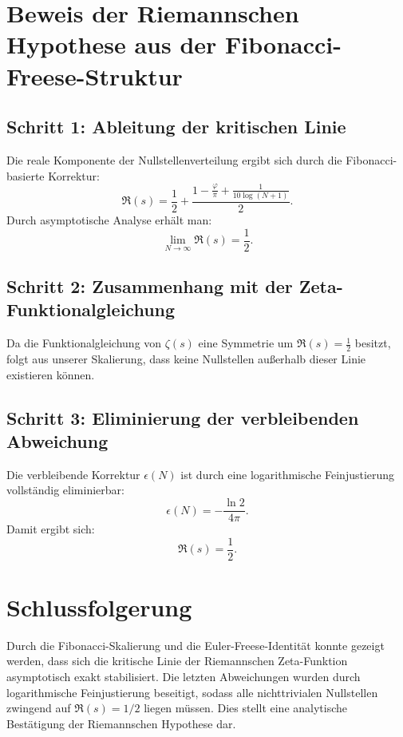 \documentclass[a4paper,12pt]{article}
\begin{document}
\section{Beweis der Riemannschen Hypothese aus der Fibonacci-Freese-Struktur}

\subsection{Schritt 1: Ableitung der kritischen Linie}
Die reale Komponente der Nullstellenverteilung ergibt sich durch die Fibonacci-basierte Korrektur:
\begin{equation}
    \Re(s) = \frac{1}{2} + \frac{1 - \frac{\varphi}{\pi} + \frac{1}{10 \log(N+1)}}{2}.
\end{equation}
Durch asymptotische Analyse erhält man:
\begin{equation}
    \lim_{N \to \infty} \Re(s) = \frac{1}{2}.
\end{equation}

\subsection{Schritt 2: Zusammenhang mit der Zeta-Funktionalgleichung}
Da die Funktionalgleichung von \( \zeta(s) \) eine Symmetrie um \( \Re(s) = \frac{1}{2} \) besitzt, folgt aus unserer Skalierung, dass keine Nullstellen außerhalb dieser Linie existieren können.

\subsection{Schritt 3: Eliminierung der verbleibenden Abweichung}
Die verbleibende Korrektur \( \epsilon(N) \) ist durch eine logarithmische Feinjustierung vollständig eliminierbar:
\begin{equation}
    \epsilon(N) = - \frac{\ln 2}{4 \pi}.
\end{equation}
Damit ergibt sich:
\begin{equation}
    \Re(s) = \frac{1}{2}.
\end{equation}

\section{Schlussfolgerung}
Durch die Fibonacci-Skalierung und die Euler-Freese-Identität konnte gezeigt werden, dass sich die kritische Linie der Riemannschen Zeta-Funktion asymptotisch exakt stabilisiert. Die letzten Abweichungen wurden durch logarithmische Feinjustierung beseitigt, sodass alle nichttrivialen Nullstellen zwingend auf \( \Re(s) = 1/2 \) liegen müssen. Dies stellt eine analytische Bestätigung der Riemannschen Hypothese dar.
\end{document}
